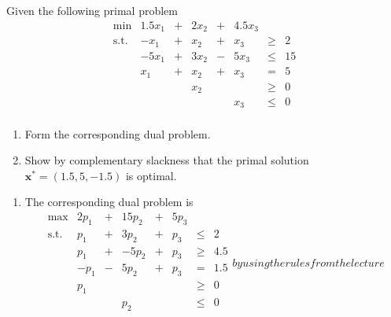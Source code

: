 \documentclass{article}
\begin{document}
\begin{exercise}[LP Duality]
    Given the following primal problem \begin{equation*}
        \begin{array}{crcrcrcr}
             \min & 1.5 x_1 & + & 2x_2 &+ & 4.5x_3\\
             \text{s.t.}&  -x_1 & + & x_2 &+ & x_3 & \geq &2\\
             &  -5x_1 & + & 3x_2 &- & 5x_3 & \leq &15\\
              &  x_1 & + & x_2 &+ & x_3 & = &5\\
              &  &  & x_2 & & & \geq &0\\
              & &  &  & & x_3 & \leq &0\\
        \end{array}
    \end{equation*}
    \begin{enumerate}
        \item Form the corresponding dual problem.
        \item Show by complementary slackness that the primal solution $\mathbf x^* = (1.5,5, -1.5)$ is optimal.
    \end{enumerate}
\end{exercise}
\begin{solving}
    \begin{enumerate}
        \item The corresponding dual problem is \begin{equation*}
            \begin{array}{crcrcrcr}
             \max & 2 p_1 & + & 15p_2 &+ & 5p_3\\
             \text{s.t.}&  p_1 & + & 3p_2 &+ & p_3 & \leq &2\\
             &  p_1 & + & -5p_2 &+ & p_3 & \geq &4.5\\
              &  -p_1 & - & 5p_2 &+ & p_3 & = &1.5\\
              & p_1 &  &  & & & \geq &0\\
              & &  &p_2   & & & \leq &0\\
        \end{array}
        by using the rules from the lecture
        \end{equation*}
    \end{enumerate}
\end{solving}
\end{document}
